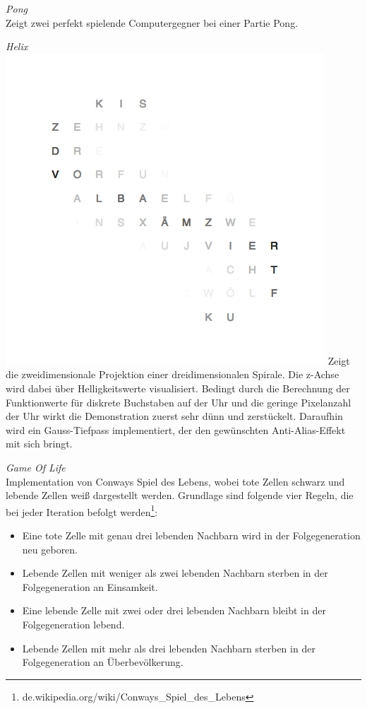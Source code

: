 \emph{Pong} \\
Zeigt zwei perfekt spielende Computergegner bei einer Partie Pong.

\emph{Helix} \\
\includegraphics[width=\columnwidth]{Abbildungen/Demo/Helix}
Zeigt die zweidimensionale Projektion einer dreidimensionalen Spirale. Die z-Achse wird dabei über Helligkeitswerte visualisiert.
Bedingt durch die Berechnung der Funktionwerte für diskrete Buchstaben auf der Uhr und die geringe Pixelanzahl der Uhr wirkt die Demonstration zuerst sehr dünn und zerstückelt.
Daraufhin wird ein Gauss-Tiefpass implementiert, der den gewünschten Anti-Alias-Effekt mit sich bringt.

\emph{Game Of Life} \\
Implementation von Conways Spiel des Lebens, wobei tote Zellen schwarz und lebende Zellen weiß dargestellt werden.
Grundlage sind folgende vier Regeln, die bei jeder Iteration befolgt werden\footnote{de.wikipedia.org/wiki/Conways\_Spiel\_des\_Lebens}:
\begin{itemize}
    \item Eine tote Zelle mit genau drei lebenden Nachbarn wird in der Folgegeneration neu geboren.
    \item Lebende Zellen mit weniger als zwei lebenden Nachbarn sterben in der Folgegeneration an Einsamkeit.
    \item Eine lebende Zelle mit zwei oder drei lebenden Nachbarn bleibt in der Folgegeneration lebend.
    \item Lebende Zellen mit mehr als drei lebenden Nachbarn sterben in der Folgegeneration an Überbevölkerung.
\end{itemize}

